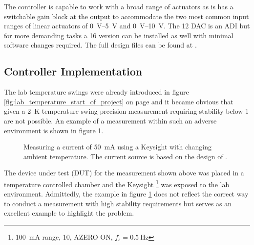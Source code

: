 The controller is capable to work with a broad range of actuators as is has a switchable gain block at the output to accommodate the two most common input ranges of linear actuators of \qtyrange[range-units = single, range-phrase={~to~}]{0}{5}{\V} and \qtyrange[range-units = single, range-phrase={~to~}]{0}{10}{\V}. The \qty{12}{\bit} DAC is an ADI  \cite{datasheet_AD5681R} but for more demanding tasks a \qty{16}{\bit} version  can be installed as well with minimal software changes required. The full design files can be found at \cite{git_labnode_kicad}.

\subsection{Controller Implementation}
The lab temperature swings were already introduced in figure \ref{fig:lab_temperature_start_of_project} on page \pageref{fig:lab_temperature_start_of_project} and it became obvious that given a \qty{2}{\kelvin} temperature swing precision measurement requiring stability below \qty{1}{\ppm} are not possible. An example of a measurement within such an adverse environment is shown in figure \ref{fig:laser_driver_aircon}.
\begin{figure}[ht]
    \centering
    \caption{Measuring a current of \qty{50}{\mA} using a Keysight  with changing ambient temperature. The current source is based on the design of \citeauthor{laser_driver_digital} \cite{laser_driver_digital}.}
    \label{fig:laser_driver_aircon}
\end{figure}

The device under test (DUT) for the measurement shown above was placed in a temperature controlled chamber and the Keysight \footnote{\qty{100}{\mA} range, \qty{10}{\plc}, AZERO ON, $f_s = \qty{0.5}{\Hz}$} was exposed to the lab environment. Admittedly, the example in figure \ref{fig:laser_driver_aircon} does not reflect the correct way to conduct a measurement with high stability requirements but serves as an excellent example to highlight the problem.

